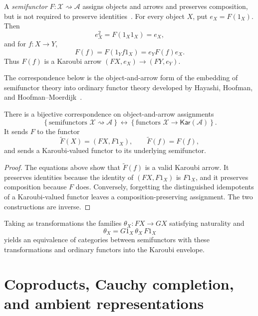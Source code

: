 \documentclass[runningheads,envcountsame]{llncs}
\newcommand{\Kar}{\mathsf{Kar}}
\newcommand{\semiarrow}{\rightsquigarrow}
\begin{document}
A \emph{semifunctor} $F:\mathcal X\semiarrow\mathcal A$ assigns objects and arrows and preserves composition, but is not required to preserve identities~\cite{Hoofman1993,HoofmanMoerdijk1995}. For every object $X$, put $e_X=F(1_X)$. Then
$$
e_X^2=F(1_X1_X)=e_X,
$$
and for $f:X\to Y$,
$$
F(f)=F(1_Yf1_X)=e_YF(f)e_X.
$$
Thus $F(f)$ is a Karoubi arrow $(FX,e_X)\to(FY,e_Y)$.

The correspondence below is the object-and-arrow form of the embedding of semifunctor theory into ordinary functor theory developed by Hayashi, Hoofman, and Hoofman--Moerdijk~\cite{Hayashi1985,Hoofman1993,HoofmanMoerdijk1995}.

\begin{proposition}
\label{prop:semi-kar-app}
There is a bijective correspondence on object-and-arrow assignments
$$
\left\{\text{semifunctors }\mathcal X\semiarrow\mathcal A\right\}
\longleftrightarrow
\left\{\text{functors }\mathcal X\to\Kar(\mathcal A)\right\}.
$$
It sends $F$ to the functor
$$
\widetilde F(X)=(FX,F1_X),
\qquad
\widetilde F(f)=F(f),
$$
and sends a Karoubi-valued functor to its underlying semifunctor.
\end{proposition}

\begin{proof}
The equations above show that $\widetilde F(f)$ is a valid Karoubi arrow. It preserves identities because the identity of $(FX,F1_X)$ is $F1_X$, and it preserves composition because $F$ does. Conversely, forgetting the distinguished idempotents of a Karoubi-valued functor leaves a composition-preserving assignment. The two constructions are inverse.
\end{proof}

Taking as transformations the families $\theta_X:FX\to GX$ satisfying naturality and
$$
\theta_X=G1_X\,\theta_X\,F1_X
$$
yields an equivalence of categories between semifunctors with these transformations and ordinary functors into the Karoubi envelope.












\section{Coproducts, Cauchy completion, and ambient representations}
\label{app:completion-details}
\label{app:explicit-equivalence}
\end{document}
